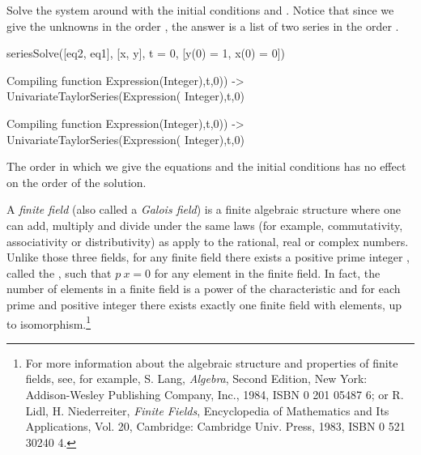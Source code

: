 {{{{{{{{{{{{{{{{\begin{xtc}
\begin{xtccomment}
Solve the system around  with the initial conditions
 and .
Notice that since we give the unknowns in the
order \spad{[x, y]}, the answer is a list of two series in the order
.
\end{xtccomment}
\begin{spadsrc}
seriesSolve([eq2, eq1], [x, y], t = 0, [y(0) = 1, x(0) = 0])
\end{spadsrc}
\begin{MessageOutput}
   Compiling function %
      Expression(Integer),t,0)) -> UnivariateTaylorSeries(Expression(
      Integer),t,0) 
\end{MessageOutput}
\begin{MessageOutput}
   Compiling function %
      Expression(Integer),t,0)) -> UnivariateTaylorSeries(Expression(
      Integer),t,0) 
\end{MessageOutput}
\begin{TeXOutput}
\begin{fricasmath}{7}
%
\end{fricasmath}
\end{TeXOutput}
\end{xtc}
\noindent
The order in which we give the
equations and the initial conditions has no effect on the order of
the solution.

%

A {\it finite field} (also called a {\it Galois field}) is a
finite algebraic structure where one can add, multiply and divide
under the same laws (for example, commutativity, associativity or
distributivity) as apply to the rational, real or complex numbers.
Unlike those three fields, for any finite field there exists a
positive prime integer , called the
, such that
$p \: x = 0$
for any element  in the finite field.
In fact, the number of elements in a finite field is a power of
the characteristic and for each prime  and positive
integer  there exists exactly one finite field with
 elements, up to
isomorphism.\footnote{For more information about the algebraic
structure and properties of finite fields, see, for example, S.
Lang, {\it Algebra}, Second Edition, New York: Addison-Wesley
Publishing Company, Inc., 1984, ISBN 0 201 05487 6; or R.
Lidl, H.
Niederreiter, {\it Finite Fields}, Encyclopedia of Mathematics and
Its Applications, Vol.
20, Cambridge: Cambridge Univ.
Press, 1983, ISBN 0 521 30240 4.}

}}}}}}}}}}}}}}}}
